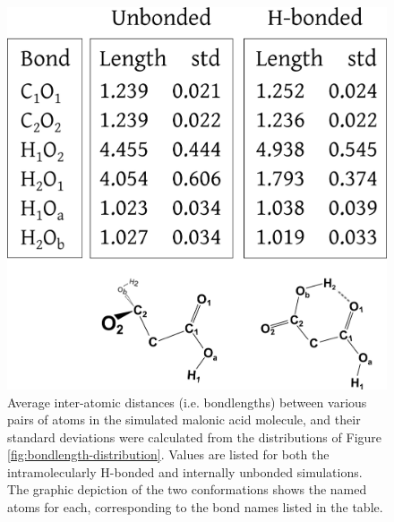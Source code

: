 \begin{figure}[h!]
	\begin{center}
		\includegraphics[scale=1.0]{images/bond-length/bondlength-table.png}
		\caption{Average inter-atomic distances (i.e. bondlengths) between various pairs of atoms in the simulated malonic acid molecule, and their standard deviations were calculated from the distributions of Figure \ref{fig:bondlength-distribution}. Values are listed for both the intramolecularly H-bonded and internally unbonded simulations. The graphic depiction of the two conformations shows the named atoms for each, corresponding to the bond names listed in the table.}
	\label{table:peaks}
	\end{center}
\end{figure}
